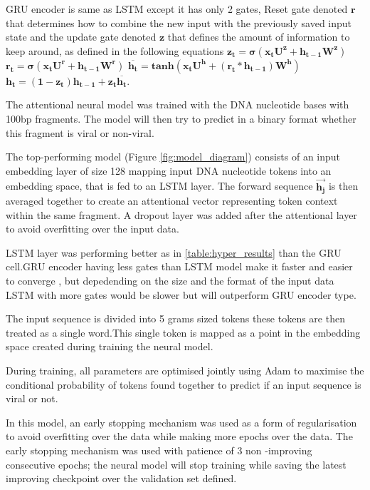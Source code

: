 \documentclass[conference]{IEEEtran}
\begin{document}
GRU encoder is same as LSTM except it has only 2 gates, Reset gate denoted $\mathbf{r}$ that determines how to combine the new input with the previously saved input state and the update gate denoted $\mathbf{z}$ that defines the amount of information to keep around, as defined  in the following equations \newline
$\mathbf{z_{t}=\sigma(x_{t}U^z + h_{t-1}W^z)}$ \newline
$\mathbf{r_{t}=\sigma(x_{t}U^r + h_{t-1}W^r)}$ \newline
$\mathbf{\overline{h_{t}} = tanh(x_{t}U^h + (r_{t} * h_{t-1})W^h )}$ \newline
$\mathbf{ h_{t} = (1-z_{t})h_{t-1} +z_{t}\overline{h_{t}}}$.


The attentional neural model was trained with the DNA nucleotide bases with 100bp fragments. The model will then try to predict in a binary format whether this fragment is viral or non-viral.

The top-performing model (Figure \ref{fig:model_diagram}) consists of an input embedding layer of size 128 mapping input DNA nucleotide tokens into an embedding space, that is fed to an LSTM layer. The forward sequence $\mathbf{\overrightarrow{h_{j}}}$ is then averaged together to create an attentional vector representing token context within the same fragment. A dropout layer was added after the attentional layer to avoid overfitting over the input data.

LSTM layer was performing better as in \ref{table:hyper_results} than the GRU cell.GRU encoder having less gates than LSTM model make it faster and easier to converge , but depedending on the size and the format of the input data LSTM with more gates would be slower but will outperform GRU encoder type.

The input sequence is divided into 5 grams sized tokens these tokens are then treated as a single word.This single token is mapped as a point in the embedding space created during training the neural model.

During training, all parameters are optimised jointly using Adam to maximise the conditional probability of tokens found together to predict if an input sequence is viral or not.

In this model, an early stopping mechanism was used as a form of regularisation to avoid overfitting over the data while making more epochs over the data. The early stopping mechanism was used with patience of 3 non -improving consecutive epochs; the neural model will stop training while saving the latest improving checkpoint over the validation set defined.
\end{document}
